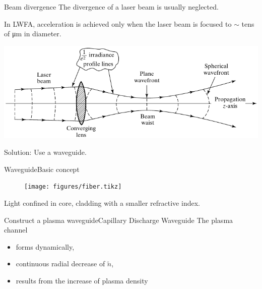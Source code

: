 \documentclass[dvipsnames]{beamer}
\begin{document}
  \begin{frame}{Beam divergence}
    The divergence of a laser beam is usually neglected.

    In LWFA, acceleration is achieved only when the laser beam is focused to $\sim$ tens of \si{\um} in diameter.
    \begin{center}
      \includegraphics[width=\textwidth]{figures/theory/laser_lens_rayleigh.pdf}
    \end{center}
    Solution: Use a waveguide.
  \end{frame}
  \begin{frame}{Waveguide}{Basic concept}
  \begin{figure}
     \texttt{[image: figures/fiber.tikz]}
   \end{figure}
   Light confined in core, cladding with a smaller refractive index.
  \end{frame}
  \begin{frame}{Construct a plasma waveguide}{Capillary Discharge Waveguide}
    The plasma channel
    \begin{itemize}
      \item[\textbullet] forms dynamically,
      \item[\textbullet] continuous radial decrease of $\tilde n$,
      \item[\textbullet] results from the increase of plasma density
    \end{itemize}
  \end{frame}
\end{document}
